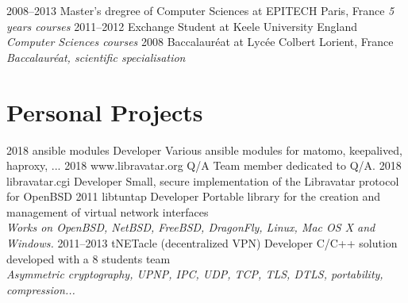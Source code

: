 \documentclass[]{friggeri-cv} %
\begin{document}
\begin{entrylist}
\entry
{2008--2013}
{Master's dregree {\normalfont of Computer Sciences} at EPITECH}
{Paris, France}
{\emph{5 years courses}}
\entry
{2011--2012}
{Exchange Student {\normalfont at Keele University}}
{England}
{\emph{Computer Sciences courses}}
\entry
{2008}
{Baccalauréat {\normalfont at Lycée Colbert}}
{Lorient, France}
{\emph{Baccalauréat, scientific specialisation}}
\end{entrylist}


\section{Personal Projects}
\begin{entrylist}
\entry
{2018}
{ansible modules}
{Developer}
{Various ansible modules for matomo, keepalived, haproxy, ...}
\entry
{2018}
{www.libravatar.org}
{Q/A}
{Team member dedicated to Q/A.}
\entry
{2018}
{libravatar.cgi}
{Developer}
{Small, secure implementation of the Libravatar protocol for OpenBSD}
\entry
{2011}
{libtuntap}
{Developer}
{Portable library for the creation and management of virtual network interfaces\\
\emph{Works on OpenBSD, NetBSD, FreeBSD, DragonFly, Linux, Mac OS X and Windows.}}
\entry
{2011--2013}
{tNETacle (decentralized VPN)}
{Developer}
{C/C++ solution developed with a 8 students team \\
\emph{Asymmetric cryptography, UPNP, IPC, UDP, TCP, TLS, DTLS, portability, compression...}}
\end{entrylist}
\end{document}
